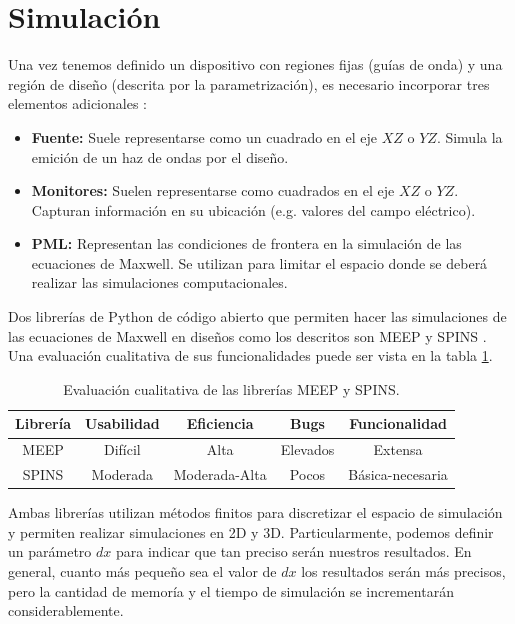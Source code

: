 \section{Simulación}

Una vez tenemos definido un dispositivo con regiones fijas (guías de onda) y una
región de diseño (descrita por la parametrización), es necesario incorporar
tres elementos adicionales \citep{Su2020}:

\begin{itemize}

  \item \textbf{Fuente:} Suele representarse como un cuadrado en el eje $XZ$
    o $YZ$. Simula la emición de un haz de ondas por el diseño.

  \item \textbf{Monitores:} Suelen representarse como cuadrados en el eje $XZ$
    o $YZ$. Capturan información en su ubicación (e.g. valores del campo
    eléctrico).

  \item \textbf{PML:} Representan las condiciones de frontera en la simulación
    de las ecuaciones de Maxwell. Se utilizan para limitar el espacio donde se
    deberá realizar las simulaciones computacionales.

\end{itemize}

Dos librerías de Python de código abierto que permiten hacer las simulaciones
de las ecuaciones de Maxwell en diseños como los descritos son MEEP \citep{Oskooi2010} y SPINS \citep{Su2020}. 
Una evaluación cualitativa de sus funcionalidades puede ser vista en la tabla \ref{tab:simulation}.

\begin{table}[ht]
    \centering
    \begin{tabular}{|c|c|c|c|c|}
    \hline 
    Librería &  Usabilidad & Eficiencia & Bugs & Funcionalidad \\
    \hline 
    MEEP &  Difícil & Alta & Elevados & Extensa \\
    SPINS &  Moderada  & Moderada-Alta & Pocos & Básica-necesaria \\
    \hline 
    \end{tabular}
    \caption{Evaluación cualitativa de las librerías MEEP y SPINS.}
    \label{tab:simulation}
\end{table}

Ambas librerías utilizan métodos finitos para discretizar el espacio de
simulación y permiten realizar simulaciones en 2D y 3D. 
Particularmente, podemos definir un parámetro $dx$ para indicar que tan preciso
serán nuestros resultados. En general, cuanto más pequeño sea el valor de $dx$
los resultados serán más precisos, pero la cantidad de memoría y el tiempo de
simulación se incrementarán considerablemente.


